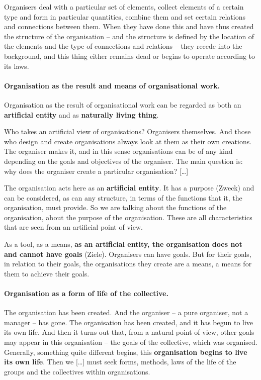 \documentclass[11pt,a4paper]{article}
\begin{document}
Organisers deal with a particular set of elements, collect elements of a
certain type and form in particular quantities, combine them and set certain
relations and connections between them. When they have done this and have thus
created the structure of the organisation – and the structure is defined by
the location of the elements and the type of connections and relations – they
recede into the background, and this thing either remains dead or begins to
operate according to its laws.

\paragraph{Organisation as the result and means of organisational work.}
\cite[p. 29]{MSM} Organisation as the result of organisational work can be
regarded as both an \textbf{artificial entity} and as \textbf{naturally living
  thing}.

Who takes an artificial view of organisations? Organisers themselves. And
those who design and create organisations always look at them as their own
creations.  The organiser makes it, and in this sense organisations can be of
any kind depending on the goals and objectives of the organiser. The main
question is: why does the organiser create a particular organisation?
[\ldots]

The organisation acts here as an \textbf{artificial entity}. It has a purpose
(Zweck) and can be considered, as can any structure, in terms of the functions
that it, the organisation, must provide. So we are talking about the functions
of the organisation, about the purpose of the organisation.  These are all
characteristics that are seen from an artificial point of view.

As a tool, as a means, \textbf{as an artificial entity, the organisation does
  not and cannot have goals} (Ziele). Organisers can have goals. But for their
goals, in relation to their goals, the organisations they create are a means,
a means for them to achieve their goals.

\paragraph{Organisation as a form of life of the collective.}
\cite[p. 30]{MSM} The organisation has been created. And the organiser – a
pure organiser, not a manager – has gone. The organisation has been created,
and it has begun to live its own life. And then it turns out that, from a
natural point of view, other goals may appear in this organisation – the goals
of the collective, which was organised. Generally, something quite different
begins, this \textbf{organisation begins to live its own life}. Then we
[\ldots] must seek forms, methods, laws of the life of the groups and the
collectives within organisations.
\end{document}
